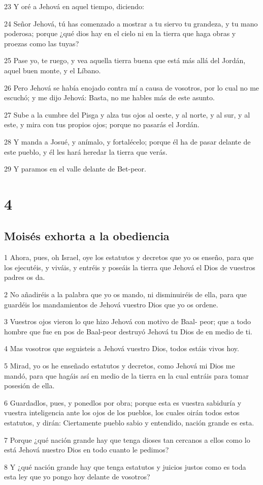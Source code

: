 \par 23 Y oré a Jehová en aquel tiempo, diciendo:
\par 24 Señor Jehová, tú has comenzado a mostrar a tu siervo tu grandeza, y tu mano poderosa; porque ¿qué dios hay en el cielo ni en la tierra que haga obras y proezas como las tuyas?
\par 25 Pase yo, te ruego, y vea aquella tierra buena que está más allá del Jordán, aquel buen monte, y el Líbano.
\par 26 Pero Jehová se había enojado contra mí a causa de vosotros, por lo cual no me escuchó; y me dijo Jehová: Basta, no me hables más de este asunto.
\par 27 Sube a la cumbre del Pisga y alza tus ojos al oeste, y al norte, y al sur, y al este, y mira con tus propios ojos; porque no pasarás el Jordán.
\par 28 Y manda a Josué, y anímalo, y fortalécelo; porque él ha de pasar delante de este pueblo, y él les hará heredar la tierra que verás.
\par 29 Y paramos en el valle delante de Bet-peor.

\chapter{4}

\section{Moisés exhorta a la obediencia}

\par 1 Ahora, pues, oh Israel, oye los estatutos y decretos que yo os enseño, para que los ejecutéis, y viváis, y entréis y poseáis la tierra que Jehová el Dios de vuestros padres os da.
\par 2 No añadiréis a la palabra que yo os mando, ni disminuiréis de ella, para que guardéis los mandamientos de Jehová vuestro Dios que yo os ordene.
\par 3 Vuestros ojos vieron lo que hizo Jehová con motivo de Baal- peor; que a todo hombre que fue en pos de Baal-peor destruyó Jehová tu Dios de en medio de ti.
\par 4 Mas vosotros que seguisteis a Jehová vuestro Dios, todos estáis vivos hoy.
\par 5 Mirad, yo os he enseñado estatutos y decretos, como Jehová mi Dios me mandó, para que hagáis así en medio de la tierra en la cual entráis para tomar posesión de ella.
\par 6 Guardadlos, pues, y ponedlos por obra; porque esta es vuestra sabiduría y vuestra inteligencia ante los ojos de los pueblos, los cuales oirán todos estos estatutos, y dirán: Ciertamente pueblo sabio y entendido, nación grande es esta.
\par 7 Porque ¿qué nación grande hay que tenga dioses tan cercanos a ellos como lo está Jehová nuestro Dios en todo cuanto le pedimos?
\par 8 Y ¿qué nación grande hay que tenga estatutos y juicios justos como es toda esta ley que yo pongo hoy delante de vosotros?

